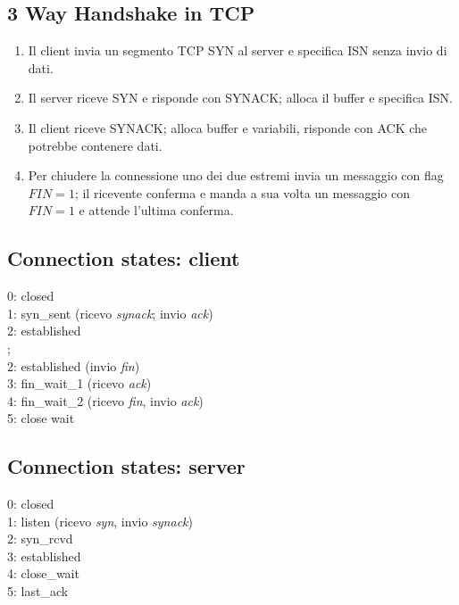 \subsection{3 Way Handshake in TCP}
\begin{enumerate}
	\item Il client invia un segmento TCP SYN al server e specifica ISN senza invio di dati.
	\item Il server riceve SYN e risponde con SYNACK; alloca il buffer e specifica ISN.
	\item Il client riceve SYNACK; alloca buffer e variabili, risponde con ACK che potrebbe contenere dati.
	\item Per chiudere la connessione uno dei due estremi invia un messaggio con flag $ FIN=1 $; il ricevente conferma e manda a sua volta un messaggio con $ FIN=1 $ e attende l'ultima conferma.
\end{enumerate}

\subsection{Connection states: client}
0: closed\\
1: syn\_sent		(ricevo \textit{synack}; invio \textit{ack})\\
2: established\\
;\\
2: established		(invio \textit{fin})\\
3: fin\_wait\_1		(ricevo \textit{ack})\\
4: fin\_wait\_2		(ricevo \textit{fin}, invio \textit{ack})\\
5: close wait\\

\subsection{Connection states: server}
0: closed\\
1: listen			(ricevo \textit{syn}, invio \textit{synack})\\
2: syn\_rcvd\\
3: established\\
4: close\_wait\\
5: last\_ack\\

